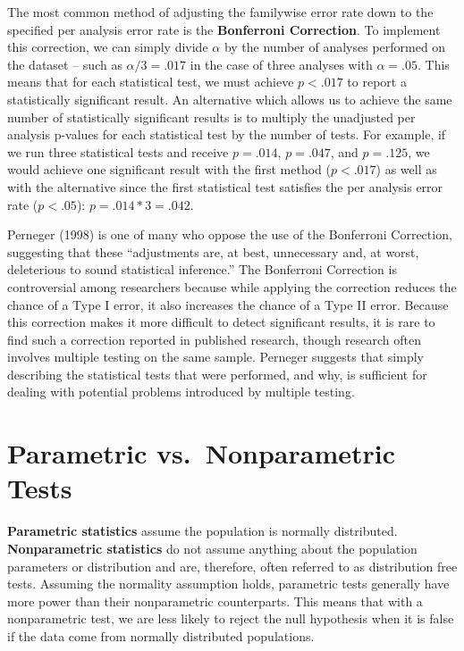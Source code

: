 \documentclass[]{book}
\begin{document}
The most common method of adjusting the familywise error rate down to the specified per analysis error rate is the \textbf{Bonferroni Correction}. To implement this correction, we can simply divide \(\alpha\) by the number of analyses performed on the dataset -- such as \(\alpha / 3 = .017\) in the case of three analyses with \(\alpha = .05\). This means that for each statistical test, we must achieve \(p < .017\) to report a statistically significant result. An alternative which allows us to achieve the same number of statistically significant results is to multiply the unadjusted per analysis p-values for each statistical test by the number of tests. For example, if we run three statistical tests and receive \(p = .014\), \(p = .047\), and \(p = .125\), we would achieve one significant result with the first method (\(p < .017\)) as well as with the alternative since the first statistical test satisfies the per analysis error rate (\(p < .05\)): \(p = .014 * 3 = .042\).

Perneger (1998) is one of many who oppose the use of the Bonferroni Correction, suggesting that these ``adjustments are, at best, unnecessary and, at worst, deleterious to sound statistical inference.'' The Bonferroni Correction is controversial among researchers because while applying the correction reduces the chance of a Type I error, it also increases the chance of a Type II error. Because this correction makes it more difficult to detect significant results, it is rare to find such a correction reported in published research, though research often involves multiple testing on the same sample. Perneger suggests that simply describing the statistical tests that were performed, and why, is sufficient for dealing with potential problems introduced by multiple testing.

\hypertarget{parametric-vs.nonparametric-tests}{%
\section{Parametric vs.~Nonparametric Tests}\label{parametric-vs.nonparametric-tests}}

\textbf{Parametric statistics} assume the population is normally distributed. \textbf{Nonparametric statistics} do not assume anything about the population parameters or distribution and are, therefore, often referred to as distribution free tests. Assuming the normality assumption holds, parametric tests generally have more power than their nonparametric counterparts. This means that with a nonparametric test, we are less likely to reject the null hypothesis when it is false if the data come from normally distributed populations.
\end{document}
